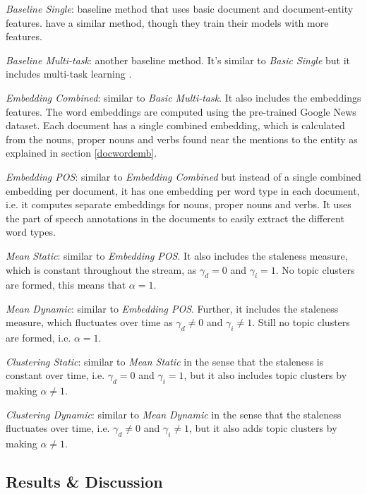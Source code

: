 \documentclass{article}
\begin{document}
\begin{itemize*}
  \item {\textit{Baseline Single}}: baseline method that uses basic document and document-entity features. \citet{jingang13, bellogin13} have a similar method, though they train their models with more features.
  \item {\textit{Baseline Multi-task}}: another baseline method. It's similar to {\textit{Basic Single}} but it includes multi-task learning \cite{Caruana93multitasklearning}.
  \item {\textit{Embedding Combined}}: similar to {\textit{Basic Multi-task}}. It also includes the embeddings features. The word embeddings are computed using the pre-trained Google News dataset. Each document has a single combined embedding, which is calculated from the nouns, proper nouns and verbs found near the mentions to the entity as explained in section \ref{docwordemb}.
  \item {\textit{Embedding POS}}: similar to {\textit{Embedding Combined}} but instead of a single combined embedding per document, it has one embedding per word type in each document, i.e. it computes separate embeddings for nouns, proper nouns and verbs. It uses the part of speech annotations in the documents to easily extract the different word types.
  \item {\textit{Mean Static}}: similar to {\textit{Embedding POS}}. It also includes the staleness measure, which is constant throughout the stream, as $\gamma_d = 0$ and $\gamma_i = 1$. No topic clusters are formed, this means that $\alpha = 1$.
  \item {\textit{Mean Dynamic}}: similar to {\textit{Embedding POS}}. Further, it includes the staleness measure, which fluctuates over time as $\gamma_d \neq 0$ and $\gamma_i \neq 1$. Still no topic clusters are formed, i.e. $\alpha = 1$.
  \item {\textit{Clustering Static}}: similar to {\textit{Mean Static}} in the sense that the staleness is constant over time, i.e. $\gamma_d = 0$ and $\gamma_i = 1$, but it also includes topic clusters by making $\alpha \neq 1$.
  \item {\textit{Clustering Dynamic}}: similar to {\textit{Mean Dynamic}} in the sense that the staleness fluctuates over time, i.e. $\gamma_d \neq 0$ and $\gamma_i \neq 1$, but it also adds topic clusters by making $\alpha \neq 1$.
\end{itemize*}

\subsection{Results \& Discussion}
\end{document}
